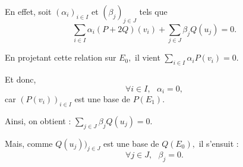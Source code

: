 En effet, soit $(\alpha_{i})_{i\in I}$ et $(\beta_{j})_{j\in J}$ tels que $$\sum_{i\in I}\alpha_{i}(P+2Q)(v_{i})+\sum_{j\in J}\beta_{j}Q(u_{j})=0.$$

En projetant cette relation sur $E_{0},$ il vient $\displaystyle \sum_{i\in I}\alpha_{i}P(v_{i})=0.$ 

Et donc, $$\forall i\in I,\mbox{ } \alpha_{i}=0,$$ car $(P(v_{i}))_{i\in I}$ est une base de $P(E_{1}).$

Ainsi, on obtient : $\displaystyle \sum_{j\in J}\beta_{j}Q(u_{j})=0.$

Mais, comme $Q(u_{j}))_{j\in J}$ est une base de $Q(E_{0}),$ il s'ensuit : $$\forall j\in J,\mbox{ } \beta_{j}=0.$$  





